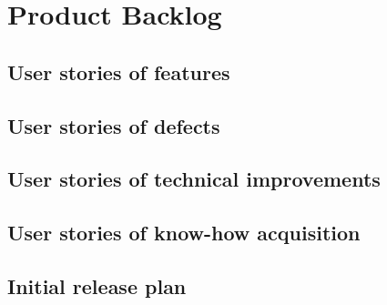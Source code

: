 \section{Product Backlog}
\subsection{User stories of features}
\subsection{User stories of defects}
\subsection{User stories of technical improvements}
\subsection{User stories of know-how acquisition}
\subsection{Initial release plan}